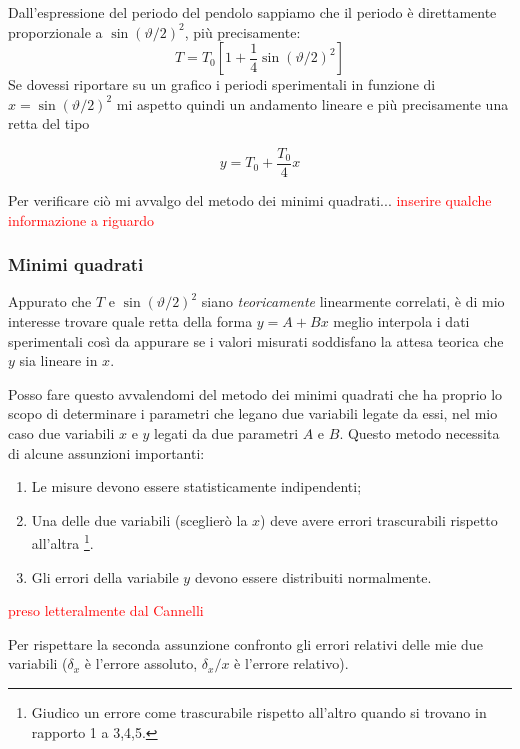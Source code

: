 \documentclass{article}
\begin{document}
\noindent
Dall'espressione del periodo del pendolo sappiamo che il periodo è direttamente proporzionale a $\sin\left(\vartheta/2\right)^2$, più precisamente:
\[
T = T_0 \left[ 1 + \frac{1}{4}\sin{\left(\vartheta/2\right)}^2 \right]
\]
Se dovessi riportare su un grafico i periodi sperimentali in funzione di $x = \sin{\left(\vartheta/2\right)}^2$ mi aspetto quindi un andamento lineare e più precisamente una retta del tipo

\[
y = T_0 + \frac{T_0}{4}x
\]

\noindent
Per verificare ciò mi avvalgo del metodo dei minimi quadrati...
\textcolor{red}{inserire qualche informazione a riguardo}

\newpage
\subsubsection{Minimi quadrati}
Appurato che $T$ e $\sin{\left(\vartheta/2\right)}^2$ siano \textit{teoricamente} linearmente correlati, è di mio interesse trovare quale retta della forma $y = A + Bx$ meglio interpola i dati sperimentali così da appurare se i valori misurati soddisfano la attesa teorica che $y$ sia lineare in $x$. 

Posso fare questo avvalendomi del metodo dei minimi quadrati che ha  proprio lo scopo di determinare i parametri che legano due variabili legate da essi, nel mio caso due variabili $x$ e $y$ legati da due parametri $A$ e $B$. Questo metodo necessita di alcune assunzioni importanti: 

\begin{enumerate}
	\item Le misure devono essere statisticamente indipendenti;
	\item Una delle due variabili (sceglierò la $x$) deve avere errori trascurabili rispetto all'altra \footnote{Giudico un errore come trascurabile rispetto all'altro quando si trovano in rapporto 1 a 3,4,5.}.
	\item Gli errori della variabile $y$ devono essere distribuiti normalmente.
\end{enumerate}
\textcolor{red}{preso letteralmente dal Cannelli}

\noindent
Per rispettare la seconda assunzione confronto gli errori relativi delle mie due variabili ($\delta_x$ è l'errore assoluto, $\delta_x/x$ è l'errore relativo).
\end{document}
